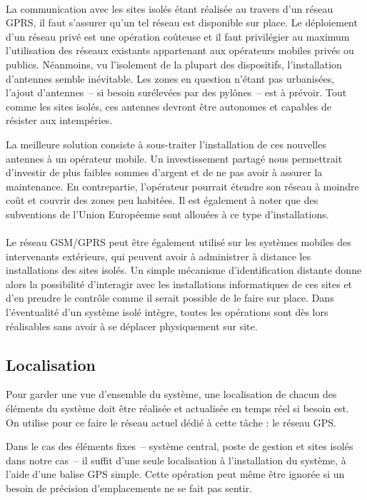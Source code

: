 \documentclass[a4paper, 11pt, final]{article}
\begin{document}
\paragraph{}
La communication avec les sites isolés étant réalisée au travers d'un
réseau GPRS, il faut s'assurer qu'un tel réseau est disponible sur
place. Le déploiement d'un réseau privé est une opération coûteuse et
il faut privilégier au maximum l'utilisation des réseaux existants
appartenant aux opérateurs mobiles privés ou publics. Néanmoins, vu
l'isolement de la plupart des dispositifs, l'installation d'antennes
semble inévitable. Les zones en question n'étant pas urbanisées,
l'ajout d'antennes~-- si besoin surélevées par des pylônes~-- est à
prévoir. Tout comme les sites isolés, ces antennes devront être
autonomes et capables de résister aux intempéries.

La meilleure solution consiste à sous-traiter l'installation de ces
nouvelles antennes à un opérateur mobile. Un investissement partagé
nous permettrait d'investir de plus faibles sommes d'argent et de ne
pas avoir à assurer la maintenance. En contrepartie, l'opérateur
pourrait étendre son réseau à moindre coût et couvrir des zones peu
habitées. Il est également à noter que des subventions de l'Union
Européenne sont allouées à ce type d'installations.

\paragraph{}
Le réseau GSM/GPRS peut être également utilisé sur les systèmes
mobiles des intervenants extérieurs, qui peuvent avoir à administrer à
distance les installations des sites isolés. Un simple mécanisme
d'identification distante donne alors la possibilité d'interagir avec
les installations informatiques de ces sites et d'en prendre le
contrôle comme il serait possible de le faire sur place. Dans
l'éventualité d'un système isolé intègre, toutes les opérations sont
dès lors réalisables sans avoir à se déplacer physiquement sur site.

\subsection{Localisation}
Pour garder une vue d'ensemble du système, une localisation de chacun
des éléments du système doit être réalisée et actualisée en temps
réel si besoin est. On utilise pour ce faire le réseau actuel dédié à
cette tâche : le réseau GPS.

Dans le cas des éléments fixes~-- système central, poste de gestion et
sites isolés dans notre cas~-- il suffit d'une seule localisation à
l'installation du système, à l'aide d'une balise GPS simple. Cette
opération peut même être ignorée si un besoin de précision
d'emplacements ne se fait pas sentir.
\end{document}
